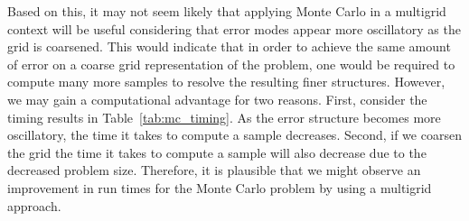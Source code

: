 \documentclass[note]{TechNote}
\begin{document}
Based on this, it may not seem likely that applying Monte Carlo in a
multigrid context will be useful considering that error modes appear
more oscillatory as the grid is coarsened. This would indicate that in
order to achieve the same amount of error on a coarse grid
representation of the problem, one would be required to compute many
more samples to resolve the resulting finer structures. However, we
may gain a computational advantage for two reasons. First, consider
the timing results in Table~\ref{tab:mc_timing}. As the error
structure becomes more oscillatory, the time it takes to compute a
sample decreases. Second, if we coarsen the grid the time it takes to
compute a sample will also decrease due to the decreased problem
size. Therefore, it is plausible that we might observe an improvement
in run times for the Monte Carlo problem by using a multigrid
approach.

\end{document}
